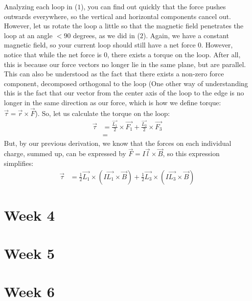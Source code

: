 \documentclass{article}
\begin{document}
Analyzing each loop in ($1$), you can find out quickly that the force pushes outwards everywhere, so the vertical and horizontal components cancel out. However, let us rotate the loop a little so that the magnetic field penetrates the loop at an angle $< 90$ degrees, as we did in ($2$). Again, we have a constant magnetic field, so your current loop should still have a net force $0$. However, notice that while the net force is $0$, there exists a torque on the loop. After all, this is because our force vectors no longer lie in the same plane, but are parallel. This can also be understood as the fact that there exists a non-zero force component, decomposed orthogonal to the loop (One other way of understanding this is the fact that our vector from the center axis of the loop to the edge is no longer in the same direction as our force, which is how we define torque: $\vec{\tau} = \vec{r}\times\vec{F}$). So, let us calculate the torque on the loop:
\begin{align*}
\vec{\tau} &= \frac{\vec{L_1}}{2}\times\vec{F_\text{1}} + \frac{\vec{L_3}}{2}\times\vec{F_\text{3}}\\
&= 
\end{align*}
But, by our previous derivation, we know that the forces on each individual charge, summed up, can be expressed by $\vec{F} = I\vec{l}\times\vec{B}$, so this expression simplifies:
\begin{align*}
\vec{\tau} &= \frac{1}{2}\vec{L_1}\times(I\vec{L_1}\times\vec{B}) + \frac{1}{2}\vec{L_3}\times (I\vec{L_3}\times\vec{B})
\end{align*}







\pagebreak

\section{Week 4}

\pagebreak

\section{Week 5}

\pagebreak

\section{Week 6}
\end{document}
